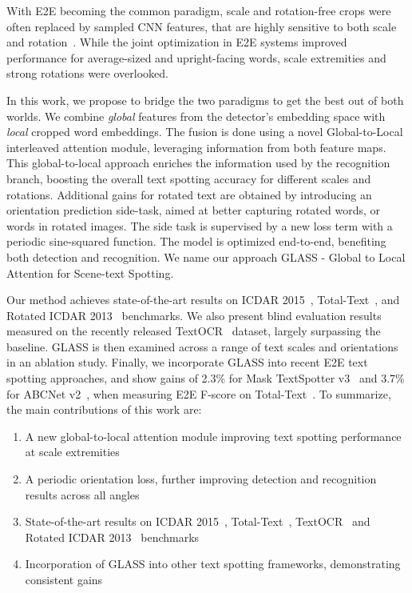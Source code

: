 \documentclass[runningheads]{llncs}
\begin{document}
With E2E becoming the common paradigm, scale and rotation-free crops were often replaced by sampled CNN features, that are highly sensitive to both scale and rotation~\cite{Jaderberg2015SpatialTN,Worrall2017HarmonicND}.
While the joint optimization in E2E systems improved performance for average-sized and upright-facing words, scale extremities and strong rotations were overlooked.

In this work, we propose to bridge the two paradigms to get the best out of both worlds.
We combine \emph{global} features from the detector's embedding space with \emph{local} cropped word embeddings.
The fusion is done using a novel Global-to-Local interleaved attention module,
leveraging information from both feature maps.
This global-to-local approach enriches the information used by the recognition branch, boosting the overall text spotting accuracy for different scales and rotations.
Additional gains for rotated text are obtained by introducing an orientation prediction side-task, aimed at better capturing rotated words, or words in rotated images.
The side task is supervised by a new loss term with a  periodic sine-squared function.
The model is optimized end-to-end, benefiting both detection and recognition.
We name our approach GLASS - Global to Local Attention for Scene-text Spotting.

Our method achieves state-of-the-art results on ICDAR 2015~\cite{karatzas2015icdar}, Total-Text~\cite{ch2017total}, and Rotated ICDAR 2013~\cite{liao2020spotterV3} benchmarks.
We also present blind evaluation results measured on the recently released TextOCR~\cite{singh2021textocr} dataset, largely surpassing the baseline.
GLASS is then examined across a range of text scales and orientations in an ablation study. 
Finally, we incorporate GLASS into recent E2E text spotting approaches, and show gains of 2.3\% for Mask TextSpotter v3~\cite{liao2020spotterV3} and 3.7\% for ABCNet v2~\cite{liu2021abcnetV2}, when measuring E2E F-score on Total-Text~\cite{ch2017total}.
To summarize, the  main contributions of this work are:
\begin{enumerate}
    \item A new global-to-local attention module improving text spotting performance at scale extremities
    \item A periodic orientation loss, further improving detection and recognition results across all angles
    \item State-of-the-art results on ICDAR 2015~\cite{karatzas2015icdar}, Total-Text~\cite{ch2017total}, TextOCR~\cite{singh2021textocr} and Rotated ICDAR 2013~\cite{liao2020spotterV3} benchmarks
    \item Incorporation of GLASS into other text spotting frameworks, demonstrating consistent gains
\end{enumerate}
\end{document}
